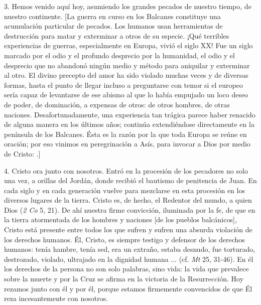 \begin{body}
	3. Hemos venido aquí hoy, asumiendo los grandes pecados de nuestro tiempo, de nuestro continente. {[}La guerra en curso en los Balcanes constituye una acumulación particular de pecados. Los humanos usan herramientas de destrucción para matar y exterminar a otros de su especie. ¡Qué terribles experiencias de guerras, especialmente en Europa, vivió el siglo XX! Fue un siglo marcado por el odio y el profundo desprecio por la humanidad, el odio y el desprecio que no abandonó ningún medio y método para aniquilar y exterminar al otro. El divino precepto del amor ha sido violado muchas veces y de diversas formas, hasta el punto de llegar incluso a preguntarse con temor si el europeo sería capaz de levantarse de ese abismo al que lo había empujado un loco deseo de poder, de dominación, a expensas de otros: de otros hombres, de otras naciones. Desafortunadamente, una experiencia tan trágica parece haber renacido de alguna manera en los últimos años; continúa extendiéndose directamente en la península de los Balcanes. Ésta es la razón por la que toda Europa se reúne en oración; por eso vinimos en peregrinación a Asís, para invocar a Dios por medio de Cristo: .{]}
	
	4. Cristo ora junto con nosotros. Entró en la procesión de los pecadores no solo una vez, a orillas del Jordán, donde recibió el bautismo de penitencia de Juan. En cada siglo y en cada generación vuelve para mezclarse en esta procesión en los diversos lugares de la tierra. Cristo es, de hecho, el Redentor del mundo, a quien Dios  (\emph{2 Co} 5, 21). De ahí nuestra firme convicción, iluminada por la fe, de que en la tierra atormentada de los hombres y naciones {[}de los pueblos balcánicos{]}, Cristo está presente entre todos los que sufren y sufren una absurda violación de los derechos humanos. Él, Cristo, es siempre testigo y defensor de los derechos humanos: tenía hambre, tenía sed, era un extraño, estaba desnudo, fue torturado, destrozado, violado, ultrajado en la dignidad humana ... (cf. \emph{Mt} 25, 31-46). En él los derechos de la persona no son solo palabras, sino vida: la vida que prevalece sobre la muerte y por la Cruz se afirma en la victoria de la Resurrección. Hoy rezamos junto con él y por él, porque estamos firmemente convencidos de que Él reza incesantemente con nosotros.
	

\end{body}
